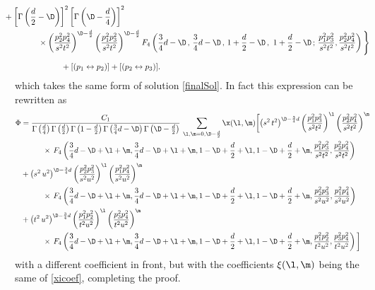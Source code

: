 \documentclass[a4paper,11pt,openright,twoside]{book}
\numberwithin{equation}{section}
\begin{document}
{\begin{align}
	&\hspace{-0.5cm}+\left[\Gamma\left(\frac{d}{2}-\D\right)\right]^2\left[\Gamma\left(\D-\frac{d}{4}\right)\right]^2 \notag\\
	&\hspace{1cm}\times \left(\frac{p_2^2p_4^2}{s^2t^2}\right)^{\D-\frac{d}{2}}\left(\frac{p_1^2p_3^2}{s^2t^2}\right)^{\D-\frac{d}{2}}F_4\left(\frac{3}{4}d-\D\,,\,\frac{3}{4}d-\D\, ,\,1+\frac{d}{2}-\D\,,\,\,1+\frac{d}{2}-\D\,;\,\frac{p_1^2p_3^2}{s^2t^2},\frac{p_2^2p_4^2}{s^2t^2}\right)\Bigg\}\notag\\[1.2ex]
	&\hspace{2cm} +[(p_1\leftrightarrow p_2)]+[(p_2\leftrightarrow p_3)].
\end{align}
which takes the same form of solution \eqref{finalSol}. In fact this expression can be rewritten as
\begin{align}
	\Phi&=\frac{C_1}{\Gamma\left(\frac{d}{4}\right)\Gamma\left(\frac{d}{2}\right)\Gamma\left(1-\frac{d}{2}\right)\Gamma\left(\frac{3}{4}d-\D\right)\Gamma\left(\D-\frac{d}{2}\right)}\,\sum_{\l,\m=0,\D-\frac{d}{2}}\x(\l,\m)\bigg[\big(s^2\,t^2\big)^{\D-\frac{3}{4}d}\left(\frac{p_1^2 p_3^2}{s^2 t^2}\right)^\l\left(\frac{p_2^2p_4^2}{s^2t^2}\right)^\m\notag\\
	&\hspace{1cm}\times\,F_4\left(\frac{3}{4}d-\D+\l+\m,\frac{3}{4}d-\D+\l+\m,1-\D+\frac{d}{2}+\l,1-\D+\frac{d}{2}+\m,\frac{p_1^2 p_3^2}{s^2 t^2},\frac{p_2^2 p_4^2}{s^2 t^2}\right)\notag\\
	&+\big(s^2\,u^2\big)^{\D-\frac{3}{4}d}\left(\frac{p_2^2 p_3^2}{s^2 u^2}\right)^\l\left(\frac{p_1^2p_4^2}{s^2u^2}\right)^\m\notag\\
	&\hspace{1cm}\times\,F_4\left(\frac{3}{4}d-\D+\l+\m,\frac{3}{4}d-\D+\l+\m,1-\D+\frac{d}{2}+\l,1-\D+\frac{d}{2}+\m,\frac{p_2^2 p_3^2}{s^2 u^2},\frac{p_1^2 p_4^2}{s^2 u^2}\right)\notag\\
	&+\big(t^2\,u^2\big)^{\D-\frac{3}{4}d}\left(\frac{p_1^2 p_2^2}{t^2 u^2}\right)^\l\left(\frac{p_3^2p_4^2}{t^2u^2}\right)^\m\notag\\
	&\hspace{1cm}\times\,F_4\left(\frac{3}{4}d-\D+\l+\m,\frac{3}{4}d-\D+\l+\m,1-\D+\frac{d}{2}+\l,1-\D+\frac{d}{2}+\m,\frac{p_1^2 p_2^2}{t^2 u^2},\frac{p_3^2 p_4^2}{t^2 u^2}\right)\bigg]
	\label{finf}
\end{align}
with a different coefficient in front, but with the coefficients $\xi(\l,\m)$ being the same of \eqref{xicoef}, completing the proof. \\
}
\end{document}
